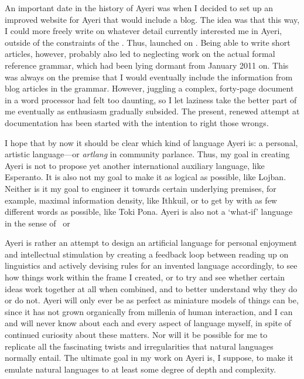 An important date in the history of Ayeri was when I decided to set up an
improved website for Ayeri that would include a blog. The idea was that this
way, I could more freely write on whatever detail currently interested me in
Ayeri, outside of the constraints of the . Thus,  launched on . Being able to write
short articles, however, probably also led to neglecting work on the actual
formal reference grammar, which had been lying dormant from January 2011 on.
This was always on the premise that I would eventually include the information
from blog articles in the grammar. However, juggling a complex, forty-page
document in a word processor had felt too daunting, so I let laziness take the
better part of me eventually as enthusiasm gradually subsided. 
The present, renewed attempt at documentation has been started with the
intention to right those wrongs.

I hope that by now it should be clear which kind of language Ayeri is: a
personal, artistic language---or \emph{artlang} in community parlance. Thus, my
goal in creating Ayeri is not to propose yet another international auxiliary
language, like Esperanto. It is also not my goal to make it as logical as
possible, like Lojban. Neither is it my goal to engineer it towards certain
underlying premises, for example, maximal information density, like Ithkuil, or
to get by with as few different words as possible, like Toki Pona. Ayeri is
also not a `what-if' language in the sense of \ or

Ayeri is rather an attempt to design an artificial language for personal
enjoyment and intellectual stimulation by creating a feedback loop between
reading up on linguistics and actively devising rules for an invented language
accordingly, to see how things work within the frame I created, or to try and
see whether certain ideas work together at all when combined, and to better
understand why they do or do not. Ayeri will only ever be as perfect as
miniature models of things can be, since it has not grown organically from
millenia of human interaction, and I can and will never know about each and
every aspect of language myself, in spite of continued curiosity about these
matters. Nor will it be possible for me to replicate all the fascinating twists
and irregularities that natural languages normally entail. The ultimate
goal in my work on Ayeri is, I suppose, to make it emulate natural
languages to at least some degree of depth and complexity.

